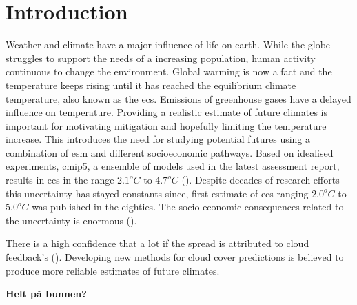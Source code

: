 \chapter{Introduction} \label{ch:introduction}
Weather and climate have a major influence of life on earth. While the globe struggles to support the needs of a increasing population, human activity continuous to change the environment. Global warming is now a fact and the temperature keeps rising until it has reached the equilibrium climate temperature, also known as the \acrfull{ecs}. Emissions of greenhouse gases have a delayed influence on temperature. Providing a realistic estimate of future climates is important for motivating mitigation and hopefully limiting the temperature increase. This introduces the need for studying potential futures using a combination of \acrfull{esm} and different socioeconomic pathways. Based on idealised experiments, \acrfull{cmip5}, a ensemble of models used in the latest assessment report, results in \acrshort{ecs} in the range $2.1^oC$ to $4.7^oC$ (\cite{IPCC_CH9_climate_models}). Despite decades of research efforts this uncertainty has stayed constants since, \cite{hansen} first estimate of \acrshort{ecs} ranging $2.0^oC$ to $5.0^oC$ was published in the eighties. The socio-economic consequences related to the uncertainty is enormous (\cite{bony2015}). 

There is a high confidence that a lot if the spread is attributed to cloud feedback's (\cite{IPCC_CH9_climate_models}). Developing new methods for cloud cover predictions is believed to produce more reliable estimates of future climates.

\textbf{Helt på bunnen?}

